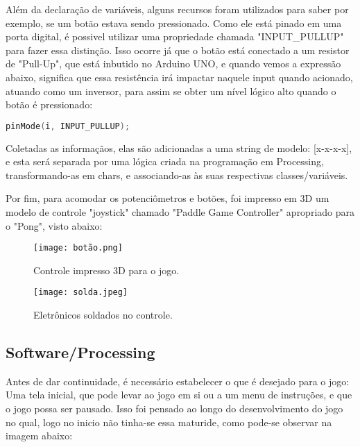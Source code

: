 	Além da declaração de variáveis, alguns recursos foram utilizados para saber por exemplo, se um botão estava sendo pressionado. Como ele está pinado em uma porta digital, é possivel utilizar uma propriedade chamada "INPUT\_PULLUP"	para fazer essa distinção. Isso ocorre já que o botão está conectado a um resistor de "Pull-Up", que está inbutido no Arduino UNO, e quando vemos a expressão abaixo, significa que essa resistência irá impactar naquele input quando acionado, atuando como um inversor, para assim se obter um nível lógico alto quando o botão é pressionado:

\begin{lstlisting}[language=C]
pinMode(i, INPUT_PULLUP);
\end{lstlisting}

	Coletadas as informaçãos, elas são adicionadas a uma string de modelo: [x-x-x-x], e esta será separada por uma lógica criada na programação em Processing, transformando-as em chars, e associando-as às suas respectivas classes/variáveis.

	Por fim, para acomodar os potenciômetros e botões, foi impresso em 3D um modelo de controle "joystick" chamado "Paddle Game Controller" apropriado para o "Pong", visto abaixo:

\begin{figure}[htbp]
     \centerline{
        \texttt{[image: botão.png]}
        }
     \caption{Controle impresso 3D para o jogo.}
     \label{fig}
    \end{figure}

\begin{figure}[htbp]
     \centerline{
        \texttt{[image: solda.jpeg]}
        }
     \caption{Eletrônicos soldados no controle.}
     \label{fig}
    \end{figure}

	

\subsection{Software/Processing}

	Antes de dar continuidade, é necessário estabelecer o que é desejado para o jogo: Uma tela inicial, que 
   pode levar ao jogo em si ou a um menu de instruções, e que o jogo possa ser pausado. Isso foi pensado ao longo do 
   desenvolvimento do jogo no qual, logo no inicio não tinha-se essa maturide, como pode-se observar na imagem abaixo:
	

